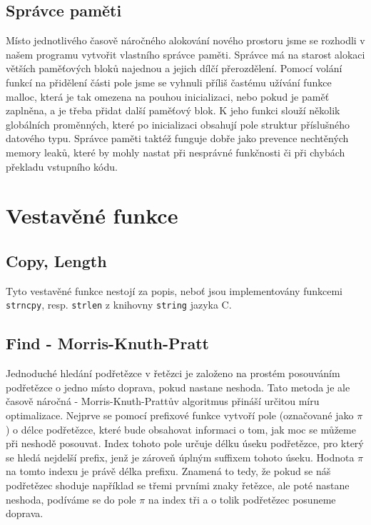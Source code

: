 ﻿\documentclass[12pt]{article}
\begin{document}
\subsection{Správce paměti}

Místo jednotlivého časově náročného alokování nového prostoru jsme se rozhodli v našem programu vytvořit vlastního správce paměti. Správce má na starost alokaci větších paměťových bloků najednou a jejich dílčí přerozdělení. Pomocí volání funkcí na přidělení části pole jsme se vyhnuli příliš častému užívání funkce malloc, která je tak omezena na pouhou inicializaci, nebo pokud je paměť zaplněna, a je třeba přidat další paměťový blok. K jeho funkci slouží několik globálních proměnných, které po inicializaci obsahují pole struktur příslušného datového typu. Správce paměti taktéž funguje dobře jako prevence nechtěných memory leaků, které by mohly nastat při nesprávné funkčnosti či při chybách překladu vstupního kódu.

\section{Vestavěné funkce}

\subsection{Copy, Length}
Tyto vestavěné funkce nestojí za popis, neboť jsou implementovány funkcemi \verb|strncpy|, resp. \verb|strlen| z knihovny \verb|string| jazyka C.

\subsection{Find - Morris-Knuth-Pratt}
Jednoduché hledání podřetězce v řetězci je založeno na prostém posouváním podřetězce o jedno místo doprava, pokud nastane neshoda. Tato metoda je ale časově náročná - Morris-Knuth-Prattův algoritmus přináší určitou míru optimalizace. Nejprve se pomocí prefixové funkce vytvoří pole (označované jako $\pi$) o délce podřetězce, které bude obsahovat informaci o tom, jak moc se můžeme při neshodě posouvat. Index tohoto pole určuje délku úseku podřetězce, pro který se hledá nejdelší prefix, jenž je zároveň úplným suffixem tohoto úseku. Hodnota $\pi$ na tomto indexu je právě délka prefixu. Znamená to tedy, že pokud se náš podřetězec shoduje například se třemi prvními znaky řetězce, ale poté nastane neshoda, podíváme se do pole $\pi$ na index tři a o tolik podřetězec posuneme doprava.
\end{document}

